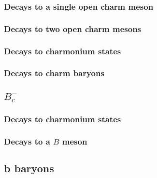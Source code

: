 \subsubsection{Decays to a single open charm meson}




\subsubsection{Decays to two open charm mesons}





\subsubsection{Decays to charmonium states}







\subsubsection{Decays to charm baryons}









\subsection{$B_c^-$}





\subsubsection{Decays to charmonium states}









\subsubsection{Decays to a $B$ meson}




\subsection{b baryons}

